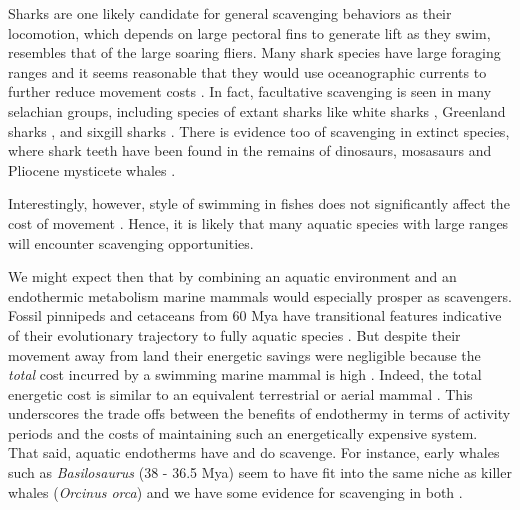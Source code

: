 \documentclass[a4paper,12pt]{article}
\begin{document}
Sharks are one likely candidate for general scavenging behaviors as their locomotion, which depends on large pectoral fins to generate lift as they swim, resembles that of the large soaring fliers.
Many shark species have large foraging ranges \citep[e.g. the great white sharks \textit{Carcharodon carcharias};][]{bruce2006movements} and it seems reasonable that they would use oceanographic currents to further reduce movement costs \citep{ruxton2004energetic}.
In fact, facultative scavenging is seen in many selachian groups, including species of extant sharks like white sharks \citep[known to feed on whale carcasses;][]{fallows2013white}, Greenland sharks \citep[feeding on seals;][]{watanabe2012slowest}, and sixgill sharks \citep{anderson2016impact}. 
There is evidence too of scavenging in extinct species, where shark teeth have been found in the remains of dinosaurs, mosasaurs and Pliocene mysticete whales \citep[5.3 - 3.6 Mya; ][]{schwimmer1997scavenging,ehret2009caught}. 

Interestingly, however, style of swimming in fishes does not significantly affect the cost of movement \citep{williams1999evolution}. Hence, it is likely that many aquatic species with large ranges will encounter scavenging opportunities. 

We might expect then that by combining an aquatic environment and an endothermic metabolism marine mammals would especially prosper as scavengers. 
Fossil pinnipeds and cetaceans from 60 Mya have transitional features indicative of their evolutionary trajectory to fully aquatic species \citep{williams1999evolution}.  
But despite their movement away from land their energetic savings were negligible because the \textit{total} cost incurred by a swimming marine mammal is high \citep{williams1999evolution}. 
Indeed, the total energetic cost is similar to an equivalent terrestrial or aerial mammal \citep{williams1999evolution}.
This underscores the trade offs between the benefits of endothermy in terms of activity periods and the costs of maintaining such an energetically expensive system. 
That said, aquatic endotherms have and do scavenge. 
For instance, early whales such as \textit{Basilosaurus} (38 - 36.5 Mya) seem to have fit into the same niche as killer whales (\textit{Orcinus orca}) and we have some evidence for scavenging in both \citep{fahlke2012bite,Whitehead415}.
\end{document}
